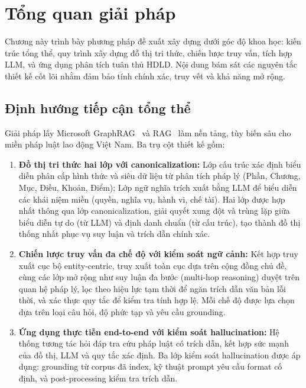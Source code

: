 \documentclass[../DoAn.tex]{subfiles}
\begin{document}
\section{Tổng quan giải pháp}
\label{section:3.1}

Chương này trình bày phương pháp đề xuất xây dựng dưới góc độ khoa học: kiến trúc tổng thể, quy trình xây dựng đồ thị tri thức, chiến lược truy vấn, tích hợp \gls{LLM}, và ứng dụng phân tích tuân thủ \gls{HDLD}. Nội dung bám sát các nguyên tắc thiết kế cốt lõi nhằm đảm bảo tính chính xác, truy vết và khả năng mở rộng.

\subsection{Định hướng tiếp cận tổng thể}
\label{subsection:3.1.1}

Giải pháp lấy Microsoft \gls{GraphRAG}~\cite{graphrag2024} và \gls{RAG}~\cite{lewis2020rag} làm nền tảng, tùy biến sâu cho miền pháp luật lao động Việt Nam. Ba trụ cột thiết kế gồm:

\begin{enumerate}[nosep, leftmargin=*]
    \item \textbf{Đồ thị tri thức hai lớp với canonicalization:} Lớp cấu trúc xác định biểu diễn phân cấp hình thức và siêu dữ liệu từ phân tích pháp lý (Phần, Chương, Mục, Điều, Khoản, Điểm); Lớp ngữ nghĩa trích xuất bằng LLM để biểu diễn các khái niệm miền (quyền, nghĩa vụ, hành vi, chế tài). Hai lớp được hợp nhất thông qua lớp canonicalization, giải quyết xung đột và trùng lặp giữa biểu diễn tự do (từ LLM) và định danh chuẩn (từ cấu trúc), tạo thành đồ thị thống nhất phục vụ suy luận và trích dẫn chính xác.
    
    \item \textbf{Chiến lược truy vấn đa chế độ với kiểm soát ngữ cảnh:} Kết hợp truy xuất cục bộ entity-centric, truy xuất toàn cục dựa trên cộng đồng chủ đề, cùng các lớp mở rộng như suy luận đa bước (multi-hop reasoning) duyệt trên quan hệ pháp lý, lọc theo hiệu lực tạm thời để ngăn trích dẫn văn bản lỗi thời, và xác thực quy tắc để kiểm tra tính hợp lệ. Mỗi chế độ được lựa chọn dựa trên loại câu hỏi, độ phức tạp và yêu cầu grounding.
    
    \item \textbf{Ứng dụng thực tiễn end-to-end với kiểm soát hallucination:} Hệ thống tương tác hỏi đáp tra cứu pháp luật có trích dẫn, kết hợp sức mạnh của đồ thị, LLM và quy tắc xác định. Ba lớp kiểm soát hallucination được áp dụng: grounding từ corpus đã index, kỹ thuật prompt yêu cầu format cố định, và post-processing kiểm tra trích dẫn.
\end{enumerate}
\end{document}
